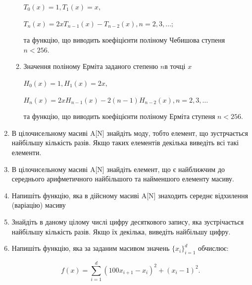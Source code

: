 \documentclass[]{article}
\makeatletter
\newcommand{\xslalph}[1]{\expandafter\@xslalph\csname c@#1\endcsname}
\newcommand{\@xslalph}[1]{%
    \ifcase#1\or а\or б\or в\or г\or д\or e\or є\or ж\or з\or i%
    \or й\or к\or л\or м\or н\or о\or п\or р\or с\or т%
    \or у\or ф\or х\or ц\or ч\or ш\or ю\or я\or аа\or бб\or вв %
    \else\@ctrerr\fi%
}
\makeatother
\begin{document}
\begin{enumerate}
\begin{enumerate}[label=\xslalph*)]
\(T_{0}(x) = 1,T_{1}(x) = x,\)

\(T_{n}(x) = 2xT_{n - 1}(x) - T_{n - 2}(x),n = 2,3,\ldots;\)

та функцію, що виводить коефіцієнти поліному Чебишова ступеня $n<256$.

\item
Значення поліному Ерміта заданого степеню \(n\)в точці \(x\)

\(H_{0}(x) = 1,H_{1}(x) = 2x,\)

\(H_{n}(x) = 2xH_{n - 1}(x) - 2(n - 1)H_{n - 2}(x),n = 2,3,\ldots\)

та функцію, що виводить коефіцієнти поліному Ерміта ступеня $n<256$.
\end{enumerate}
\item
  В цілочисельному масиві A{[}N{]} знайдіть моду, тобто елемент, що
  зустрчається найбільшу кількість разів. Якщо таких елементів декілька
  виведіть всі такі елементи.

\item
  В цілочисельному масиві A{[}N{]} знайдіть елемент, що є найближчим до
  середнього арифметичного найбільшого та найменшого елементу масиву.
\item
  Напишіть функцію, яка в дійсному масиві A{[}N{]} знаходить середнє
  відхилення (варіацію) масиву
\item
  Знайдіть в даному цілому числі цифру десяткового запису, яка
  зустрічається найбільшу кількість разів. Якщо їх декілька, виведіть
  найбільшу цифру.
\item
  Напишіть функцію, яка за заданим масивом значень
  \({\{ x_{i}\}}_{i = 1}^{d}\) обчислює:

  $$ f(x) = \sum\limits_{i=1}^{d} (100x_{i+1} -x_{i})^{2} + (x_{i}-1)^2. $$  


\end{enumerate}
\end{document}
